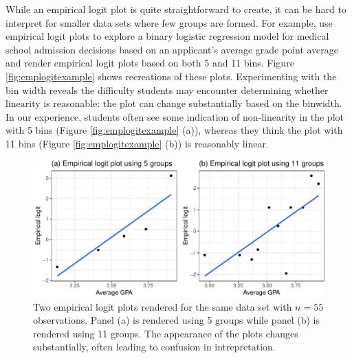 \documentclass[12pt]{article}
\begin{document}
While an empirical logit plot is quite straightforward to create, it can
be hard to interpret for smaller data sets where few groups are formed.
For example, \citet{stat2} use empirical logit plots to explore a binary
logistic regression model for medical school admission decisions based
on an applicant's average grade point average and render empirical logit
plots based on both 5 and 11 bins. Figure \ref{fig:emplogitexample}
shows recreations of these plots. Experimenting with the bin width
reveals the difficulty students may encounter determining whether
linearity is reasonable: the plot can change substantially based on the
binwidth. In our experience, students often see some indication of
non-linearity in the plot with 5 bins (Figure \ref{fig:emplogitexample}
(a)), whereas they think the plot with 11 bins (Figure
\ref{fig:emplogitexample} (b)) is reasonably linear.

\begin{figure}

{\centering \includegraphics[width=0.85\linewidth]{vizinf-paper-blind_files/figure-latex/unnamed-chunk-7-1} 

}

\caption{\label{fig:emplogitexample} Two empirical logit plots rendered for the same data set with $n=55$ observations. Panel (a) is rendered using 5 groups while panel (b) is rendered using 11 groups. The appearance of the plots changes substantially, often leading to confusion in intrepretation.}\label{fig:unnamed-chunk-7}
\end{figure}
\end{document}
